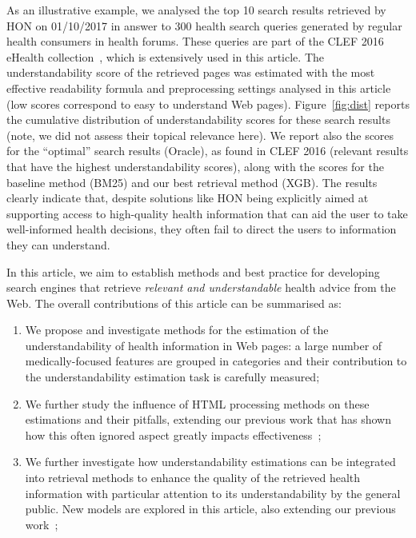 \documentclass[10pt,a4paper]{article}
\begin{document}
As an illustrative example, we analysed the top 10 search results retrieved by HON on 01/10/2017 in answer to 300 health search queries generated by regular health consumers in health forums.
These queries are part of the CLEF 2016 eHealth collection~\cite{clef16}, which is extensively used in this article. 
The understandability score of the retrieved pages was estimated with the most effective readability formula and preprocessing settings analysed in this article (low scores correspond to easy to understand Web pages).
Figure~\ref{fig:dist} reports the cumulative distribution of understandability scores for these search results (note, we did not assess their topical relevance here). 
We report also the scores for the ``optimal'' search results (Oracle), as found in CLEF 2016 (relevant results that have the highest understandability scores), along with the scores for the baseline method (BM25) and our best retrieval method (XGB). 
The results clearly indicate that, despite solutions like HON being explicitly aimed at supporting access to high-quality health information that can aid the user to take well-informed health decisions, they often fail to direct the users to information they can understand.

In this article, we aim to establish methods and best practice for developing search engines that retrieve \textit{relevant and understandable} health advice from the Web. The overall contributions of this article can be summarised as:
\begin{enumerate}
	\item We propose and investigate methods for the estimation of the understandability of health information in Web pages: a large number of medically-focused features are grouped in categories and their contribution to the understandability estimation task is carefully measured;
	\item We further study the influence of HTML processing methods on these estimations and their pitfalls, extending our previous work that has shown how this often ignored aspect greatly impacts effectiveness~\cite{palotti15};
	\item We further investigate how understandability estimations can be integrated into retrieval methods to enhance the quality of the retrieved health information with particular attention to its understandability by the general public. New models are explored in this article, also extending our previous work~\cite{palotti2016ranking};
\end{enumerate}
\end{document}
